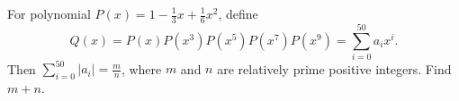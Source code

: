 For polynomial $P(x)=1-\frac{1}{3}x+\frac{1}{6}x^2$,  define \[ Q(x) = P(x)P(x^3)P(x^5)P(x^7)P(x^9) = \sum\limits_{i=0}^{50}a_ix^i. \]Then $\sum\limits_{i=0}^{50}|a_i|=\frac{m}{n}$,  where $m$ and $n$ are relatively prime positive integers. Find $m+n$.